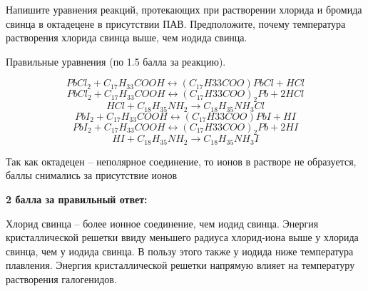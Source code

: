 
Напишите уравнения реакций, протекающих при растворении хлорида и бромида свинца в октадецене в присутствии ПАВ. Предположите, почему температура растворения хлорида свинца выше, чем иодида свинца.

Правильные уравнения (по 1.5 балла за реакцию).

\answerMath

$$PbCl_2 + C_{17}H_{33}COOH \leftrightarrow (C_{17}H{33}COO)PbCl + HCl$$
$$PbCl_2 + C_{17}H_{33}COOH \leftrightarrow (C_{17}H{33}COO)_2Pb + 2HCl$$
$$HCl + C_{18}H_{35}NH_2 \rightarrow C_{18}H_{35}NH_3Cl$$
$$PbI_2 + C_{17}H_{33}COOH \leftrightarrow (C_{17}H{33}COO)PbI + HI$$
$$PbI_2 + C_{17}H_{33}COOH \leftrightarrow (C_{17}H{33}COO)_2Pb + 2HI$$
$$HI + C_{18}H_{35}NH_2 \rightarrow C_{18}H_{35}NH_3I$$

Так как октадецен – неполярное соединение, то ионов в растворе не образуется, баллы снимались за присутствие ионов

\textbf{2 балла за правильный ответ:}

Хлорид свинца – более ионное соединение, чем иодид свинца. Энергия кристаллической решетки ввиду меньшего радиуса хлорид-иона выше у хлорида свинца, чем у иодида свинца. В пользу этого также у иодида ниже температура плавления. Энергия кристаллической решетки напрямую влияет на температуру растворения галогенидов.